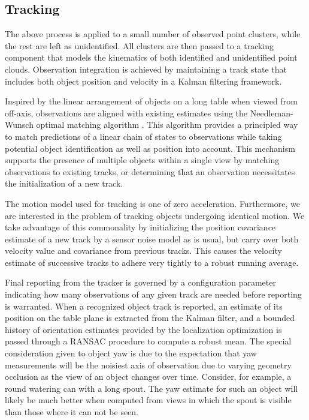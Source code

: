 \documentclass[letterpaper, 10 pt, conference]{ieeeconf}  %
\begin{document}
\subsection{Tracking}
The above process is applied to a small number of observed point
clusters, while the rest are left as unidentified. All clusters are
then passed to a tracking component that models the kinematics of both
identified and unidentified point clouds. Observation integration is
achieved by maintaining a track state that includes both object
position and velocity in a Kalman filtering framework.

Inspired by the linear arrangement of objects on a long table when
viewed from off-axis, observations are aligned with existing estimates
using the Needleman-Wunsch optimal matching algorithm
\cite{NeedlemanWunsch1970}. This algorithm provides a principled way
to match predictions of a linear chain of states to observations while
taking potential object identification as well as position into
account. This mechanism supports the presence of multiple objects
within a single view by matching observations to existing tracks, or
determining that an observation necessitates the initialization of a
new track.


The motion model used for tracking is one of zero
acceleration. Furthermore, we are interested in the problem of
tracking objects undergoing identical motion. We take advantage of
this commonality by initializing the position covariance estimate of a
new track by a sensor noise model as is usual, but carry over both
velocity value and covariance from previous tracks. This causes the
velocity estimate of successive tracks to adhere very tightly to a
robust running average.

Final reporting from the tracker is governed by a configuration
parameter indicating how many observations of any given track are
needed before reporting is warranted. When a recognized object track
is reported, an estimate of its position on the table plane is
extracted from the Kalman filter, and a bounded history of orientation
estimates provided by the localization optimization is passed through
a RANSAC \cite{Fischler1981:RANSAC} procedure to compute a robust
mean. The special consideration given to object yaw is due to the
expectation that yaw measurements will be the noisiest axis of
observation due to varying geometry occlusion as the view of an object
changes over time. Consider, for example, a round watering can with a
long spout. The yaw estimate for such an object will likely be much
better when computed from views in which the spout is visible than
those where it can not be seen.
\end{document}

